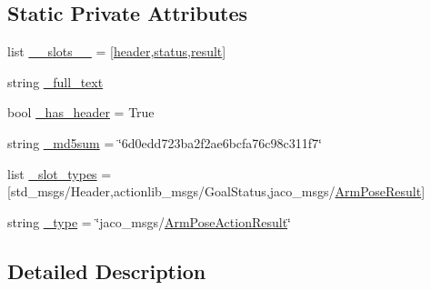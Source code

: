 \subsection*{Static Private Attributes}
\begin{DoxyCompactItemize}
\item 
list \hyperlink{classjaco__msgs_1_1msg_1_1__ArmPoseActionResult_1_1ArmPoseActionResult_a22c69d175b9a147ae5c710a585b9d69c}{\+\_\+\+\_\+slots\+\_\+\+\_\+} = \mbox{[}\textquotesingle{}\hyperlink{classjaco__msgs_1_1msg_1_1__ArmPoseActionResult_1_1ArmPoseActionResult_a91cd51f43f8421923ec5cdfbfd6a340f}{header}\textquotesingle{},\textquotesingle{}\hyperlink{classjaco__msgs_1_1msg_1_1__ArmPoseActionResult_1_1ArmPoseActionResult_ab5014de96d390234ceea56bed94a106b}{status}\textquotesingle{},\textquotesingle{}\hyperlink{classjaco__msgs_1_1msg_1_1__ArmPoseActionResult_1_1ArmPoseActionResult_a6debdadfdee3118c370d0a82f62c56ee}{result}\textquotesingle{}\mbox{]}
\item 
string \hyperlink{classjaco__msgs_1_1msg_1_1__ArmPoseActionResult_1_1ArmPoseActionResult_a58589ca3df29e7f80c38cb7349746655}{\+\_\+full\+\_\+text}
\item 
bool \hyperlink{classjaco__msgs_1_1msg_1_1__ArmPoseActionResult_1_1ArmPoseActionResult_aaf45e5afc0067a2be59ebc9f4c2e7624}{\+\_\+has\+\_\+header} = True
\item 
string \hyperlink{classjaco__msgs_1_1msg_1_1__ArmPoseActionResult_1_1ArmPoseActionResult_ab3191a9dcae3c8ab00f0be09fe4ce2f6}{\+\_\+md5sum} = \char`\"{}6d0edd723ba2f2ae6bcfa76c98c311f7\char`\"{}
\item 
list \hyperlink{classjaco__msgs_1_1msg_1_1__ArmPoseActionResult_1_1ArmPoseActionResult_a904685ef10791779a38d4f88687fc57d}{\+\_\+slot\+\_\+types} = \mbox{[}\textquotesingle{}std\+\_\+msgs/Header\textquotesingle{},\textquotesingle{}actionlib\+\_\+msgs/Goal\+Status\textquotesingle{},\textquotesingle{}jaco\+\_\+msgs/\hyperlink{classjaco__msgs_1_1msg_1_1__ArmPoseResult_1_1ArmPoseResult}{Arm\+Pose\+Result}\textquotesingle{}\mbox{]}
\item 
string \hyperlink{classjaco__msgs_1_1msg_1_1__ArmPoseActionResult_1_1ArmPoseActionResult_a8944c3111f125672f680f500ccda3347}{\+\_\+type} = \char`\"{}jaco\+\_\+msgs/\hyperlink{classjaco__msgs_1_1msg_1_1__ArmPoseActionResult_1_1ArmPoseActionResult}{Arm\+Pose\+Action\+Result}\char`\"{}
\end{DoxyCompactItemize}


\subsection{Detailed Description}



